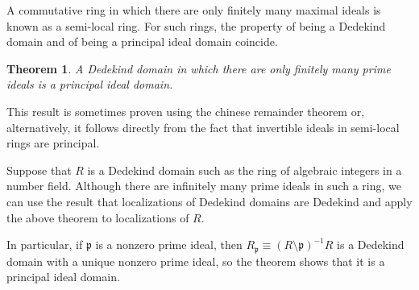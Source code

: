 \documentclass[12pt]{article}
\newtheorem*{theorem*}{Theorem}
\begin{document}
A commutative ring in which there are only finitely many maximal ideals is known as a semi-local ring. For such rings, the property of being a Dedekind domain and of being a principal ideal domain coincide.

\begin{theorem*}
A Dedekind domain in which there are only finitely many prime ideals is a principal ideal domain.
\end{theorem*}

This result is sometimes proven using the chinese remainder theorem or, alternatively, it follows directly from the fact that invertible ideals in semi-local rings are principal.

Suppose that $R$ is a Dedekind domain such as the ring of algebraic integers in a number field. Although there are infinitely many prime ideals in such a ring, we can use the result that localizations of Dedekind domains are Dedekind and apply the above theorem to localizations of $R$.

In particular, if $\mathfrak{p}$ is a nonzero prime ideal, then $R_\mathfrak{p}\equiv(R\setminus\mathfrak{p})^{-1}R$ is a Dedekind domain with a unique nonzero prime ideal, so the theorem shows that it is a principal ideal domain.

\end{document}
